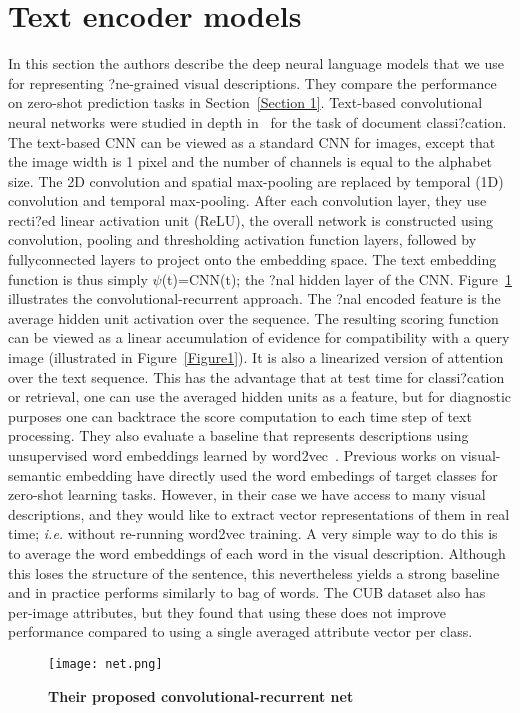 \documentclass[10pt,twocolumn,letterpaper]{article}
\begin{document}
\section{Text encoder models}
In this section the authors describe the deep neural language models that we use for representing ?ne-grained visual descriptions. They compare the performance on zero-shot prediction tasks in Section~\ref{Section 1}. Text-based convolutional neural networks were studied in depth in~\cite{name52} for the task of document classi?cation. The text-based CNN can be viewed as a standard CNN for images, except that the image width is 1 pixel and the number of channels is equal to the alphabet size. The 2D convolution and spatial max-pooling are replaced by temporal (1D) convolution and temporal max-pooling. After each convolution layer, they use recti?ed linear activation unit (ReLU), the overall network is constructed using convolution, pooling and thresholding activation function layers, followed by fullyconnected layers to project onto the embedding space. The text embedding function is thus simply $\psi$(t)=CNN(t); the ?nal hidden layer of the CNN. Figure~\ref{Figure2} illustrates the convolutional-recurrent approach. The ?nal encoded feature is the average hidden unit activation over the sequence. The resulting scoring function can be viewed as a linear accumulation of evidence for compatibility with a query image (illustrated in Figure~\ref{Figure1}). It is also a linearized version of attention over the text sequence. This has the advantage that at test time for classi?cation or retrieval, one can use the averaged hidden units as a feature, but for diagnostic purposes one can backtrace the score computation to each time step of text processing. They also evaluate a baseline that represents descriptions using unsupervised word embeddings learned by word2vec~\cite{name28}. Previous works on visual-semantic embedding have directly used the word embedings of target classes for zero-shot learning tasks. However, in their case we have access to many visual descriptions, and they would like to extract vector representations of them in real time; \emph{i.e.} without re-running word2vec training. A very simple way to do this is to average the word embeddings of each word in the visual description. Although this loses the structure of the sentence, this nevertheless yields a strong baseline and in practice performs similarly to bag of words. The CUB dataset also has per-image attributes, but they found that using these does not improve performance compared to using a single averaged attribute vector per class.
 \begin{figure}[htbp]
 \centering
 \texttt{[image: net.png]}\\
 \caption{\textbf{Their proposed convolutional-recurrent net}}\label{Figure2}
\end{figure}
\par
\end{document}
